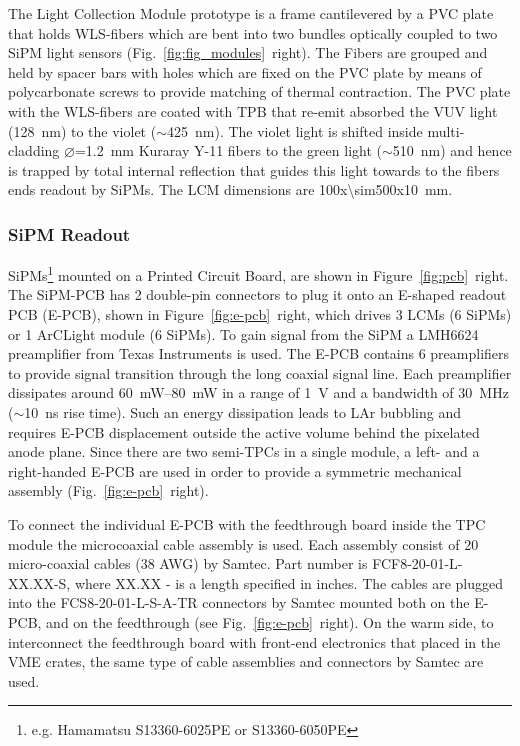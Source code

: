 The Light Collection Module prototype is a frame cantilevered by a PVC plate that holds WLS-fibers which are bent into two bundles optically coupled to two SiPM light sensors (Fig.~\ref{fig:fig_modules}~right). The Fibers are grouped and held by spacer bars with holes which are fixed on the PVC plate by means of polycarbonate screws to provide matching of thermal contraction. The PVC plate with the WLS-fibers are coated with TPB that re-emit absorbed the VUV light (\SI{128}{\nano\metre}) to the violet ($\sim$\SI{425}{\nano\metre}). The violet light is shifted inside multi-cladding $\varnothing$=\SI{1.2}{\milli\metre} Kuraray Y-11 fibers to the green light ($\sim$\SI{510}{\nano\metre}) and hence is trapped by total internal reflection that guides this light towards to the fibers ends readout by SiPMs.  The LCM dimensions are \SI[product-units=repeat]{100x\sim500x10}{\milli\metre}.

\subsubsection{SiPM Readout}

SiPMs\footnote{e.g. Hamamatsu S13360-6025PE or S13360-6050PE} mounted on a Printed Circuit Board, are shown in Figure~\ref{fig:pcb}~right. The SiPM-PCB has \num{2} double-pin connectors to plug it onto an E-shaped readout PCB (E-PCB), shown in Figure~\ref{fig:e-pcb}~right, which drives 3 LCMs (6 SiPMs) or 1 ArCLight module (6 SiPMs). To gain signal from the SiPM a LMH6624 preamplifier from Texas Instruments is used. The E-PCB contains 6 preamplifiers to provide signal transition through the long coaxial signal line. Each preamplifier dissipates around \SIrange{60}{80}{\milli\watt} in a range of \SI{1}{\volt} and a bandwidth of \SI{30}{\mega\hertz} ($\sim$\SI{10}{\nano\second} rise time). Such an energy dissipation leads to LAr bubbling and requires E-PCB displacement outside the active volume behind the pixelated anode plane. Since there are two semi-TPCs in a single module, a left- and a right-handed E-PCB are used in order to provide a symmetric mechanical assembly (Fig.~\ref{fig:e-pcb}~right). 

To connect the individual E-PCB with the feedthrough board inside the TPC module the microcoaxial cable assembly is used. Each assembly consist of \num{20} micro-coaxial cables (38 AWG) by Samtec. Part number is FCF8-20-01-L-XX.XX-S, where XX.XX - is a length specified in inches. The cables are plugged into the FCS8-20-01-L-S-A-TR connectors by Samtec mounted both on the E-PCB, and on the feedthrough (see Fig.~\ref{fig:e-pcb}~right). On the warm side, to interconnect the feedthrough board with front-end electronics that placed  in the VME crates, the same type of cable assemblies and connectors by Samtec are used. 


